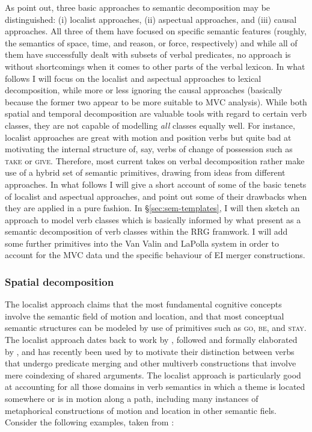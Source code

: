 As \citet{levin2005argument} point out, three basic approaches to semantic decomposition may be distinguished: (i) localist approaches, (ii) aspectual approaches, and (iii) causal approaches. All three of them have focused on specific semantic features (roughly, the semantics of space, time, and reason, or force, respectively) and while all of them have successfully dealt with subsets of verbal predicates, no approach is without shortcomings when it comes to other parts of the verbal lexicon. In what follows I will focus on the localist and aspectual approaches to lexical decomposition, while more or less ignoring the causal approaches (basically because the former two appear to be more suitable to MVC analysis). While both spatial and temporal decomposition are valuable tools with regard to certain verb classes, they are not capable of modelling \textit{all} classes equally well. For instance, localist approaches are great with motion and position verbs but quite bad at motivating the internal structure of, say, verbs of change of possession such as \textsc{take} or \textsc{give}. Therefore, most current takes on verbal decomposition rather make use of a hybrid set of semantic primitives, drawing from ideas from different approaches. In what follows I will give a short account of some of the basic tenets of localist and aspectual approaches, and point out some of their drawbacks when they are applied in a pure fashion. In §\ref{sec:sem-templates}, I will then sketch an approach to model verb classes which is basically informed by what \citet{van1997syntax} present as a semantic decomposition of verb classes within the RRG framwork. I will add some further primitives into the Van Valin and LaPolla system in order to account for the MVC data und the specific behaviour of EI merger constructions.

\subsubsection{Spatial decomposition}

The localist approach claims that the most fundamental cognitive concepts involve the semantic field of motion and location, and that most conceptual semantic structures can be modeled by use of primitives such as \textsc{go}, \textsc{be}, and \textsc{stay}. The localist approach dates back to work by \citet{gruber1965studies}, followed and formally elaborated by \citet{Jackendoff1990}, and has recently been used by \citet{baker2010complex} to motivate their distinction between verbs that undergo predicate merging and other multiverb constructions that involve mere coindexing of shared arguments. The localist approach is particularly good at accounting for all those domains in verb semantics in which a theme is located somewhere or is in motion along a path, including many instances of metaphorical constructions of motion and location in other semantic fiels. Consider the following examples, taken from \citet[25]{Jackendoff1990}:

